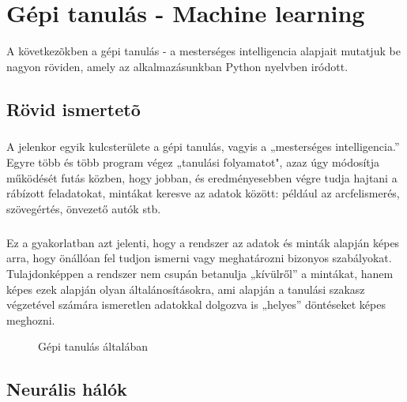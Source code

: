 \chapter{Gépi tanulás - Machine learning}\label{ch:MAT}

\begin{osszefoglal}
	A következõkben a gépi tanulás - a mesterséges intelligencia alapjait mutatjuk be nagyon röviden, amely az alkalmazásunkban Python nyelvben iródott.
\end{osszefoglal}


\section{Rövid ismertetõ}\label{sec:MAT:bev}
\paragraph{}A jelenkor egyik kulcsterülete a gépi tanulás, vagyis a „mesterséges intelligencia.” Egyre több és több program végez „tanulási folyamatot", azaz úgy módosítja működését futás közben, hogy jobban, és eredményesebben végre tudja hajtani a rábízott feladatokat, mintákat keresve az adatok között: például az arcfelismerés, szövegértés, önvezető autók stb. 
\paragraph{}Ez a gyakorlatban azt jelenti, hogy a rendszer az adatok és minták alapján képes arra, hogy önállóan fel tudjon ismerni vagy meghatározni bizonyos szabályokat. Tulajdonképpen a rendszer nem csupán betanulja „kívülről” a mintákat, hanem képes ezek alapján olyan általánosításokra, ami alapján a tanulási szakasz végzetével számára ismeretlen adatokkal dolgozva is „helyes” döntéseket képes meghozni.

\begin{figure}[t]
  \centering
  \caption[Gépi tanulás úgy általában]%
  {Gépi tanulás általában}
  \label{fig:ALAP:sm1}
\end{figure}



\section{Neurális hálók}\label{sec:MAT:bev}
